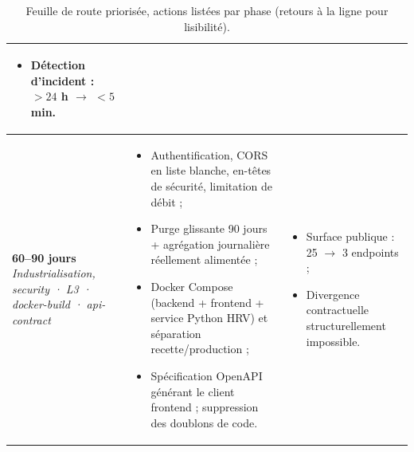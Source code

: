 \documentclass[11pt,a4paper]{article}
\begin{document}
\begin{table}[H]
\begin{tabularx}{\linewidth}{>{\raggedright\arraybackslash}p{2.3cm} >{\raggedright\arraybackslash}X >{\raggedright\arraybackslash}p{3.7cm}}
\begin{itemize}[leftmargin=1.1em,itemsep=1pt,topsep=1pt,parsep=0pt]
 \item Détection d'incident : $> 24$ h $\to$ $< 5$ min.
 \end{itemize} \\
\midrule
\rowcolor{cwblue!12}
\textbf{60--90 jours}\newline
{\footnotesize\itshape Industrialisation, security · L3 · docker-build · api-contract}
& \begin{itemize}[leftmargin=1.1em,itemsep=1pt,topsep=1pt,parsep=0pt]
 \item Authentification, CORS en liste blanche, en-têtes de sécurité, limitation de débit ;
 \item Purge glissante 90 jours + agrégation journalière réellement alimentée ;
 \item Docker Compose (backend + frontend + service Python HRV) et séparation recette/production ;
 \item Spécification OpenAPI générant le client frontend ; suppression des doublons de code.
 \end{itemize}
& \begin{itemize}[leftmargin=1.1em,itemsep=1pt,topsep=1pt,parsep=0pt]
 \item Surface publique : 25 $\to$ 3 endpoints ;
 \item Divergence contractuelle structurellement impossible.
 \end{itemize} \\
\bottomrule
\end{tabularx}
\caption{Feuille de route priorisée, actions listées par phase (retours à la ligne pour lisibilité).}
\label{tab:roadmap}
\end{table}
\end{document}
